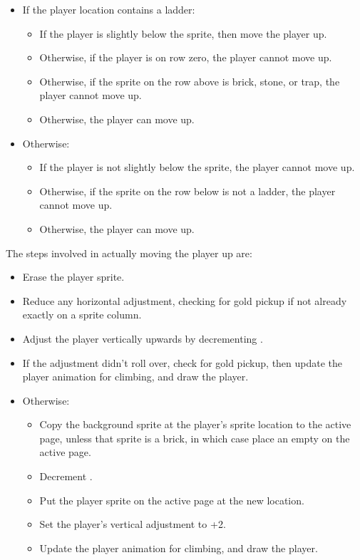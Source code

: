 \documentclass[10pt]{report}%
\begin{document}
\begin{itemize}
  \item If the player location contains a ladder:
  \begin{itemize}
    \item If the player is slightly below the sprite, then move the player up.
    \item Otherwise, if the player is on row zero, the player cannot move up.
    \item Otherwise, if the sprite on the row above is brick, stone, or trap,
          the player cannot move up.
    \item Otherwise, the player can move up.
  \end{itemize}
  \item Otherwise:
  \begin{itemize}
    \item If the player is not slightly below the sprite, the player cannot move up.
    \item Otherwise, if the sprite on the row below is not a ladder, the player cannot move up.
    \item Otherwise, the player can move up.
  \end{itemize}
\end{itemize}

The steps involved in actually moving the player up are:

\begin{itemize}
    \item Erase the player sprite.
    \item Reduce any horizontal adjustment, checking for gold pickup if not already exactly on a sprite column.
    \item Adjust the player vertically upwards by decrementing {\Tt{}\nwendquote}.
    \item If the adjustment didn't roll over, check for gold pickup, then update
          the player animation for climbing, and draw the player.
    \item Otherwise:
    \begin{itemize}
        \item Copy the background sprite at the player's sprite location to the active page, unless
              that sprite is a brick, in which case place an empty on the active page.
        \item Decrement {\Tt{}\nwendquote}.
        \item Put the player sprite on the active page at the new location.
        \item Set the player's vertical adjustment to {\Tt{}+2\nwendquote}.
        \item Update the player animation for climbing, and draw the player.
    \end{itemize}
\end{itemize}
\end{document}
